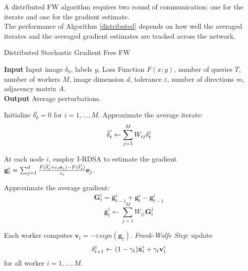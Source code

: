 A distributed FW algorithm requires two round of communication: one for the iterate and one for the gradient estimate.\\
The performance of Algorithm \ref{distributed} depends on how well the averaged iterates and the averaged gradient estimates are tracked across the network.
\begin{algorithm}
	\caption{Distributed Stochastic Gradient Free FW}\label{distributed}
	\textbf{Input} Input image \boldmath$\delta_0$, labels $y$, Loss Function $F(x;y)$, number of queries $T$, number of workers $M$, image dimension $d$, tolerance $\varepsilon$, number of directions $m$, adjacency matrix $A$.\\
	\textbf{Output} Average perturbations.
	\begin{algorithmic}[1]		
		\State Initialize \boldmath$\delta_0^i = \text{0}$ for $i=1,\dots, M$.
		\State Approximate the average iterate: \newline
		\[\bar{\text{\boldmath}\delta}_t^i \leftarrow \sum_{j=1}^{M} W_{ij}\text{\boldmath}\delta_t^i\]
		
		\State At each node $i$, employ I-RDSA to estimate the gradient 
		$\textbf{g}_t^i = \sum_{j=1}^{d} \frac{F(\bar{\text{\boldmath}\delta}_t^i + c_t\textbf{e}_j) - F(\bar{\text{\boldmath}\delta}_t^i)}{c_t}\textbf{e}_j$.
		
		\State Approximate the average gradient:
		\[ \textbf{G}_t^i = \bar{\textbf{g}}_{t-1}^i + \textbf{g}_t^i - \textbf{g}_{t-1}^i \]
		\[ \bar{\textbf{g}}_t^i \leftarrow \sum_{j=1}^{M} W_{ij}\textbf{G}_t^j  \]
		
		\State Each worker computes $\textbf{v}_t = - \varepsilon sign(\textbf{g}_t)$.
		\State \textit{Frank-Wolfe Step}: update
		\[\text{\boldmath}\delta_{t+1}^i \leftarrow (1-\gamma_t)\bar{\textbf{x}}_t^i + \gamma_t\textbf{v}_t^i\]
		for all worker $i=1, \dots, M$.
		\EndFor
		
	\end{algorithmic}
\end{algorithm}
